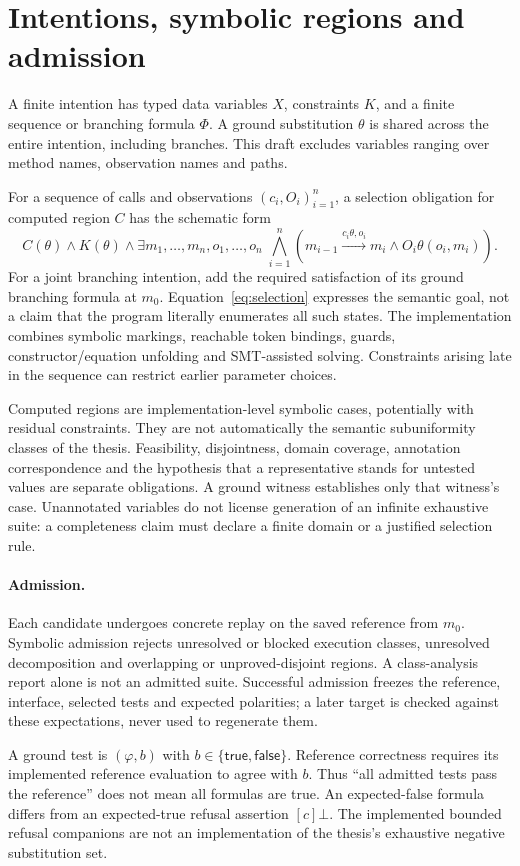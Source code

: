 \section{Intentions, symbolic regions and admission}
A finite intention has typed data variables $X$, constraints $K$, and a finite
sequence or branching formula $\Phi$. A ground substitution $\theta$ is shared
across the entire intention, including branches. This draft excludes variables
ranging over method names, observation names and paths.

For a sequence of calls and observations $(c_i,O_i)_{i=1}^n$, a selection obligation
for computed region $C$ has the schematic form
\begin{equation}\label{eq:selection}
 C(\theta)\land K(\theta)\land
 \exists m_1,\ldots,m_n,o_1,\ldots,o_n\;
 \bigwedge_{i=1}^{n}
 \left(m_{i-1}\xrightarrow{c_i\theta,o_i}m_i
 \land O_i\theta(o_i,m_i)\right).
\end{equation}
For a joint branching intention, add the required satisfaction of its ground
branching formula at $m_0$. Equation~\eqref{eq:selection} expresses the semantic
goal, not a claim that the program literally enumerates all such states. The
implementation combines symbolic markings, reachable token bindings, guards,
constructor/equation unfolding and SMT-assisted solving. Constraints arising late
in the sequence can restrict earlier parameter choices.

Computed regions are implementation-level symbolic cases, potentially with
residual constraints. They are not automatically the semantic subuniformity
classes of the thesis. Feasibility, disjointness, domain coverage, annotation
correspondence and the hypothesis that a representative stands for untested values
are separate obligations. A ground witness establishes only that witness's case.
Unannotated variables do not license generation of an infinite exhaustive suite:
a completeness claim must declare a finite domain or a justified selection rule.

\paragraph{Admission.}
Each candidate undergoes concrete replay on the saved reference from $m_0$.
Symbolic admission rejects unresolved or blocked execution classes, unresolved
decomposition and overlapping or unproved-disjoint regions. A class-analysis report
alone is not an admitted suite. Successful admission freezes the reference,
interface, selected tests and expected polarities; a later target is checked against
these expectations, never used to regenerate them.

A ground test is $(\varphi,b)$ with $b\in\{\mathsf{true},\mathsf{false}\}$.
Reference correctness requires its implemented reference evaluation to agree with
$b$. Thus ``all admitted tests pass the reference'' does not mean all formulas are
true. An expected-false formula differs from an expected-true refusal assertion
$[c]\bot$. The implemented bounded refusal companions are not an implementation
of the thesis's exhaustive negative substitution set.
